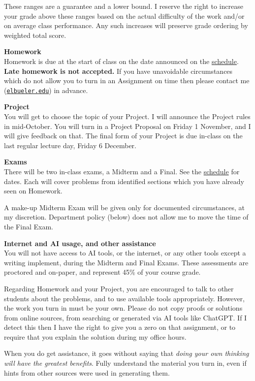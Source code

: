 \documentclass[12pt]{article}
\renewcommand{\emph}[1]{\textsf{\textbf{#1}}}
\newcommand{\localhead}[1]{\par\smallskip\textbf{#1} \smallskip\nobreak\\}%
\def\heading#1{\localhead{\large\emph{#1}}}
\def\subheading#1{\localhead{\emph{#1}}}
\begin{document}
These ranges are a guarantee and a lower bound.  I reserve the right to increase your grade above these ranges based on the actual difficulty of the work and/or on average class performance.  Any such increases will preserve grade ordering by weighted total score.

\heading{Homework}
Homework is due at the start of class on the date announced on the \href{https://bueler.github.io/numerical/assets/general/F24/schedule.pdf}{schedule}.  \emph{Late homework is not accepted.}  If you have unavoidable circumstances which do not allow you to turn in an Assignment on time then please contact me (\href{mailto:elbueler@alaska.edu}{\texttt{elbueler\@@alaska.edu}}) in advance. 

\heading{Project}
You will get to choose the topic of your Project.  I will announce the Project rules in mid-October.  You will turn in a Project Proposal on Friday 1 November, and I will give feedback on that.  The final form of your Project is due in-class on the last regular lecture day, Friday 6 December.

\heading{Exams}
There will be two in-class exams, a Midterm and a Final.  See the \href{https://bueler.github.io/numerical/assets/general/F24/schedule.pdf}{schedule} for dates.  Each will cover problems from identified sections which you have already seen on Homework.

A make-up Midterm Exam will be given only for documented circumstances, at my discretion.  Department policy (below) does not allow me to move the time of the Final Exam.

\subheading{Internet and AI usage, and other assistance}
You will not have access to AI tools, or the internet, or any other tools except a writing implement, during the Midterm and Final Exams.  These assessments are proctored and on-paper, and represent 45\% of your course grade.

Regarding Homework and your Project, you are encouraged to talk to other students about the problems, and to use available tools appropriately.  However, the work you turn in must be your own.  Please do not copy proofs or solutions from online sources, from searching or generated via AI tools like ChatGPT.  If I detect this then I have the right to give you a zero on that assignment, or to require that you explain the solution during my office hours.

When you do get assistance, it goes without saying that \textsl{doing your own thinking will have the greatest benefits}.  Fully understand the material you turn in, even if hints from other sources were used in generating them.
\end{document}
